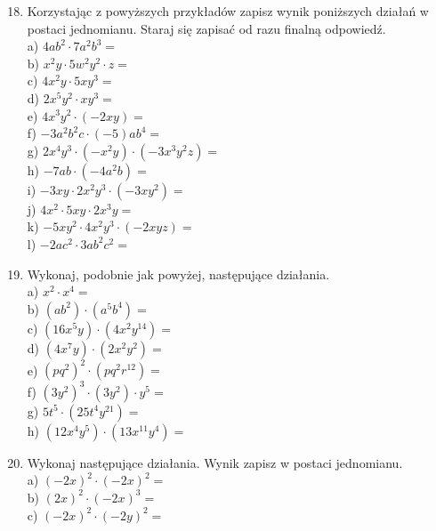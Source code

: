 \documentclass[10pt]{article}
\begin{document}
\begin{enumerate}
  \setcounter{enumi}{17}
  \item Korzystając z powyższych przykładów zapisz wynik poniższych działań w postaci jednomianu. Staraj się zapisać od razu finalną odpowiedź.\\
a) \(4 a b^{2} \cdot 7 a^{2} b^{3}=\)\\
b) \(x^{2} y \cdot 5 w^{2} y^{2} \cdot z=\)\\
c) \(4 x^{2} y \cdot 5 x y^{3}=\)\\
d) \(2 x^{5} y^{2} \cdot x y^{3}=\)\\
e) \(4 x^{3} y^{2} \cdot(-2 x y)=\)\\
f) \(-3 a^{2} b^{2} c \cdot(-5) a b^{4}=\)\\
g) \(2 x^{4} y^{3} \cdot\left(-x^{2} y\right) \cdot\left(-3 x^{3} y^{2} z\right)=\)\\
h) \(-7 a b \cdot\left(-4 a^{2} b\right)=\)\\
i) \(-3 x y \cdot 2 x^{2} y^{3} \cdot\left(-3 x y^{2}\right)=\)\\
j) \(4 x^{2} \cdot 5 x y \cdot 2 x^{3} y=\)\\
k) \(-5 x y^{2} \cdot 4 x^{2} y^{3} \cdot(-2 x y z)=\)\\
l) \(-2 a c^{2} \cdot 3 a b^{2} c^{2}=\)
  \item Wykonaj, podobnie jak powyżej, następujące działania.\\
a) \(x^{2} \cdot x^{4}=\)\\
b) \(\left(a b^{2}\right) \cdot\left(a^{5} b^{4}\right)=\)\\
c) \(\left(16 x^{5} y\right) \cdot\left(4 x^{2} y^{14}\right)=\)\\
d) \(\left(4 x^{7} y\right) \cdot\left(2 x^{2} y^{2}\right)=\)\\
e) \(\left(p q^{2}\right)^{2} \cdot\left(p q^{2} r^{12}\right)=\)\\
f) \(\left(3 y^{2}\right)^{3} \cdot\left(3 y^{2}\right) \cdot y^{5}=\)\\
g) \(5 t^{5} \cdot\left(25 t^{4} y^{21}\right)=\)\\
h) \(\left(12 x^{4} y^{5}\right) \cdot\left(13 x^{11} y^{4}\right)=\)
  \item Wykonaj następujące działania. Wynik zapisz w postaci jednomianu.\\
a) \((-2 x)^{2} \cdot(-2 x)^{2}=\)\\
b) \((2 x)^{2} \cdot(-2 x)^{3}=\)\\
c) \((-2 x)^{2} \cdot(-2 y)^{2}=\)\\

\end{enumerate}
\end{document}

